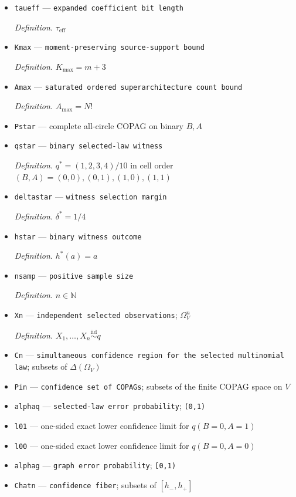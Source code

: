 \documentclass{article}
\begin{document}
\begin{itemize}
  \item \texttt{taueff} --- \texttt{expanded coefficient bit length}
  \par\smallskip\noindent\emph{Definition.} \(\tau_{\mathrm{eff}}\)
  \item \texttt{Kmax} --- \texttt{moment-\allowbreak{}preserving source-\allowbreak{}support bound}
  \par\smallskip\noindent\emph{Definition.} \(K_{\max}=m+3\)
  \item \texttt{Amax} --- \texttt{saturated ordered superarchitecture count bound}
  \par\smallskip\noindent\emph{Definition.} \(A_{\max}=N!\)
  \item \texttt{Pstar} --- complete all-circle COPAG on binary \(B,A\)
  \item \texttt{qstar} --- \texttt{binary selected-\allowbreak{}law witness}
  \par\smallskip\noindent\emph{Definition.} \(q^*=(1,2,3,4)/10\) in cell order \((B,A)=(0,0),(0,1),(1,0),(1,1)\)
  \item \texttt{deltastar} --- \texttt{witness selection margin}
  \par\smallskip\noindent\emph{Definition.} \(\delta^*=1/4\)
  \item \texttt{hstar} --- \texttt{binary witness outcome}
  \par\smallskip\noindent\emph{Definition.} \(h^*(a)=a\)
  \item \texttt{nsamp} --- \texttt{positive sample size}
  \par\smallskip\noindent\emph{Definition.} \(n\in\mathbb N\)
  \item \texttt{Xn} --- \texttt{independent selected observations}; \(\Omega_V^n\)
  \par\smallskip\noindent\emph{Definition.} \(X_1,\ldots,X_n\overset{\mathrm{iid}}{\sim}q\)
  \item \texttt{Cn} --- \texttt{simultaneous confidence region for the selected multinomial law}; subsets of \(\Delta(\Omega_V)\)
  \item \texttt{Pin} --- \texttt{confidence set of COPAGs}; subsets of the finite COPAG space on \(V\)
  \item \texttt{alphaq} --- \texttt{selected-\allowbreak{}law error probability}; \texttt{(0,\allowbreak{}1)}
  \item \texttt{l01} --- one-sided exact lower confidence limit for \(q(B=0,A=1)\)
  \item \texttt{l00} --- one-sided exact lower confidence limit for \(q(B=0,A=0)\)
  \item \texttt{alphag} --- \texttt{graph error probability}; \texttt{[0,\allowbreak{}1)}
  \item \texttt{Chatn} --- \texttt{confidence fiber}; subsets of \([h_-,h_+]\)
\end{itemize}
\end{document}
